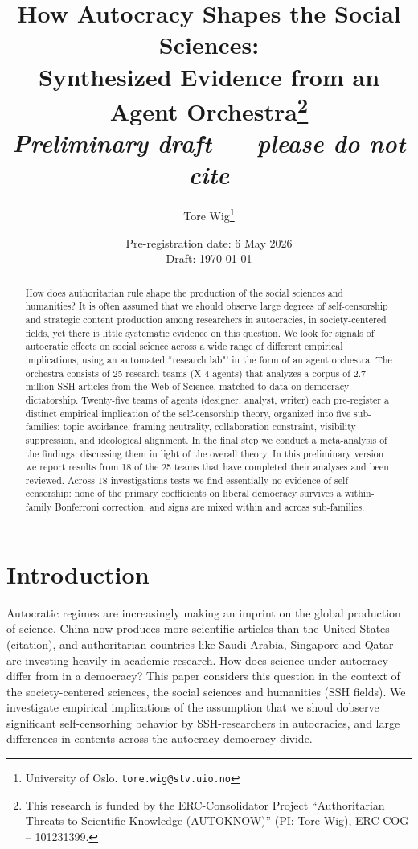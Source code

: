 \documentclass[12pt,a4paper]{article}
\title{\textbf{How Autocracy Shapes the Social Sciences:\\
Synthesized Evidence from an Agent Orchestra}\thanks{This research is funded by the ERC-Consolidator Project ``Authoritarian Threats to Scientific Knowledge (AUTOKNOW)'' (PI: Tore Wig), ERC-COG -- 101231399.}\\[0.5em]
\large\normalfont\textit{Preliminary draft --- please do not cite}}
\author{Tore Wig\thanks{University of Oslo. \texttt{tore.wig@stv.uio.no}}}
\date{Pre-registration date: 6 May 2026\\
\small Draft: \today}
\begin{document}
\maketitle
\onehalfspacing

\begin{abstract}
How does authoritarian rule shape the production of the social sciences and humanities? It is often assumed that we should observe large degrees of self-censorship and strategic content production among researchers in autocracies, in society-centered fields, yet there is little systematic evidence on this question. We look for signals of autocratic effects on social science across a wide range of different empirical implications, using an automated ``research lab"' in the form of an agent orchestra. The orchestra consists of 25 research teams (X 4 agents) that analyzes a corpus of 2.7 million SSH articles from the Web of Science, matched to data on democracy-dictatorship. Twenty-five teams of agents (designer, analyst, writer) each pre-register a distinct empirical implication of the self-censorship theory, organized into five sub-families: topic avoidance, framing neutrality, collaboration constraint, visibility suppression, and ideological alignment. In the final step we conduct a meta-analysis of the findings, discussing them in light of the overall theory. In this preliminary version we report results from 18 of the 25 teams that have completed their analyses and been reviewed. Across 18 investigations tests we find essentially no evidence of self-censorship: none of the primary coefficients on liberal democracy survives a within-family Bonferroni correction, and signs are mixed within and across sub-families.
\end{abstract}

\tableofcontents
\clearpage

\section{Introduction}
\label{sec:intro}
Autocratic regimes are increasingly making an imprint on the global production of science. China now produces more scientific articles than the United States (citation), and authoritarian countries like Saudi Arabia, Singapore and Qatar are investing heavily in academic research. How does science under autocracy differ from in a democracy? This paper considers this question in the context of the society-centered sciences, the social sciences and humanities (SSH fields). We investigate empirical implications of the assumption that we shoul dobserve significant self-censorhing behavior by SSH-researchers in autocracies, and large differences in contents across the autocracy-democracy divide.
\end{document}
